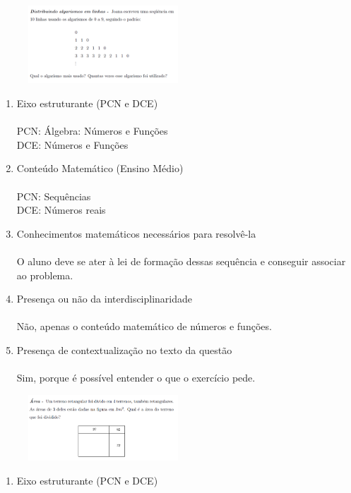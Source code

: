 \documentclass[a4paper, 12pt]{article}
\begin{document}
\begin{enumerate}
\begin{figure}[h!]
  \centering
  \includegraphics[width=0.5\textwidth]{2}
\end{figure} 
  \begin{enumerate}
  \item Eixo estruturante (PCN e DCE)\\\\
    PCN: Álgebra: Números e Funções\\
    DCE: Números e Funções
  \item Conteúdo Matemático (Ensino Médio) \\\\
    PCN: Sequências\\
    DCE: Números reais
  \item Conhecimentos matemáticos necessários para resolvê-la \\\\
    O aluno deve se ater à lei de formação dessas sequência e conseguir associar ao problema.
  \item Presença ou não da interdisciplinaridade \\\\
    Não, apenas o conteúdo matemático de números e funções.
  \item Presença de contextualização no texto da questão\\\\
    Sim, porque é possível entender o que o exercício pede.
  \end{enumerate}
\begin{figure}[h!]
  \centering
  \includegraphics[width=0.5\textwidth]{3}
\end{figure} 
  \begin{enumerate}
  \item Eixo estruturante (PCN e DCE)\\\\

\end{enumerate}
\end{enumerate}
\end{document}

